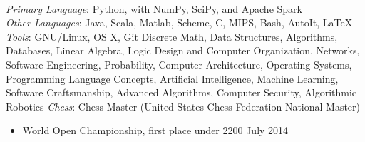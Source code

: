 \documentclass[11pt]{article}
\begin{document}
\begin{adjustwidth}{-2.2cm}{-2.2cm}
    ~\\[0.01\baselineskip]
    \emph{Primary Language}: Python, with NumPy, SciPy, and Apache Spark\\
    \emph{Other Languages}: Java, Scala, Matlab, Scheme, C, MIPS, Bash, AutoIt, \LaTeX\\
    \emph{Tools}: GNU/Linux, OS X, Git
    \eosec
    Discrete Math, Data Structures, Algorithms, Databases, Linear Algebra, Logic Design and Computer Organization, Networks, Software Engineering, Probability, Computer Architecture, Operating Systems, Programming Language Concepts, Artificial Intelligence, Machine Learning, Software Craftsmanship, Advanced Algorithms, Computer Security, Algorithmic Robotics
    \eosec
    \emph{Chess}: Chess Master (United States Chess Federation National Master)
    \begin{itemize}[nosep]
        \item World Open Championship, first place under 2200 \hfill July 2014
    \end{itemize}
\end{adjustwidth}
\end{document}
